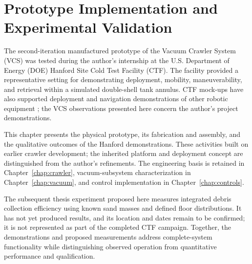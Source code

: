 \chapter{Prototype Implementation and Experimental Validation}
\label{chap:validation}
\label{chap:methods}
\label{chap:results}
\begingroup
{}
\renewcommand{\tabularxcolumn}[1]{>{\raggedright\arraybackslash}p{#1}}
\newcommand{\validationpanel}[2]{%
\begin{minipage}[t]{0.47\textwidth}\centering\singlespacing\small
\fbox{\parbox[c][25mm][c]{0.90\linewidth}{\centering\textbf{IMAGE PLACEHOLDER}\\#2}}\par\smallskip #1
\end{minipage}}
\newcommand{\validationimage}[3]{%
\begin{figure}[htbp]\centering
\fbox{\parbox[c][32mm][c]{0.88\textwidth}{\centering\small\singlespacing\textbf{IMAGE PLACEHOLDER}\\#1}}
\caption{#2}\label{#3}\end{figure}}

The second-iteration manufactured prototype of the Vacuum Crawler System (VCS) was tested during the author's internship at the U.S. Department of Energy (DOE) Hanford Site Cold Test Facility (CTF). The facility provided a representative setting for demonstrating deployment, mobility, maneuverability, and retrieval within a simulated double-shell tank annulus. CTF mock-ups have also supported deployment and navigation demonstrations of other robotic equipment \citep{doe2024CTFDemonstration}; the VCS observations presented here concern the author's project demonstrations.

This chapter presents the physical prototype, its fabrication and assembly, and the qualitative outcomes of the Hanford demonstrations. These activities built on earlier crawler development; the inherited platform and deployment concept are distinguished from the author's refinements. The engineering basis is retained in Chapter~\ref{chap:crawler}, vacuum-subsystem characterization in Chapter~\ref{chap:vacuum}, and control implementation in Chapter~\ref{chap:controls}.

The subsequent thesis experiment proposed here measures integrated debris collection efficiency using known sand masses and defined floor distributions. It has not yet produced results, and its location and dates remain to be confirmed; it is not represented as part of the completed CTF campaign. Together, the demonstrations and proposed measurements address complete-system functionality while distinguishing observed operation from quantitative performance and qualification.

